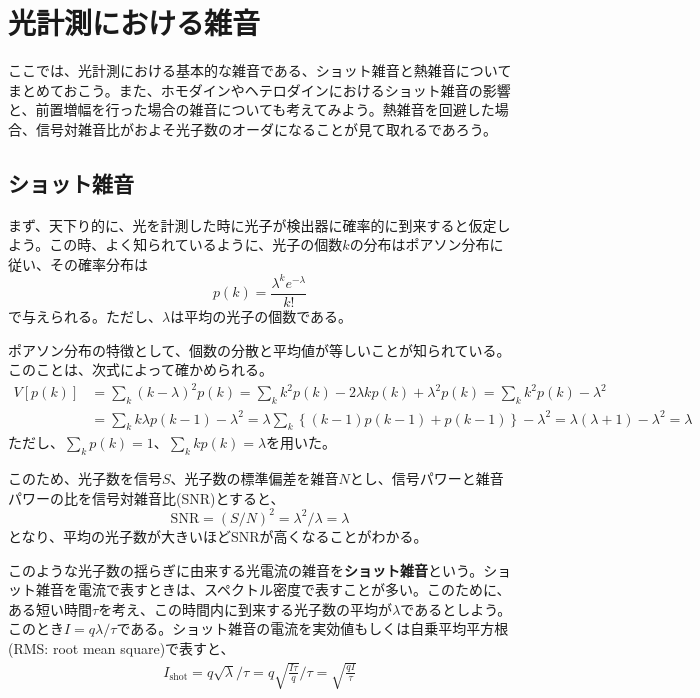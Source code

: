 \section{光計測における雑音}\label{section:1.2}

ここでは、光計測における基本的な雑音である、ショット雑音と熱雑音についてまとめておこう。また、ホモダインやヘテロダインにおけるショット雑音の影響と、前置増幅を行った場合の雑音についても考えてみよう。熱雑音を回避した場合、信号対雑音比がおよそ光子数のオーダになることが見て取れるであろう。

\subsection{ショット雑音}
まず、天下り的に、光を計測した時に光子が検出器に確率的に到来すると仮定しよう。この時、よく知られているように、光子の個数$k$の分布はポアソン分布に従い、その確率分布は
\begin{equation}
	p(k) = \frac{\lambda^k e^{-\lambda}}{k!}
\end{equation}
で与えられる。ただし、$\lambda$は平均の光子の個数である。

ポアソン分布の特徴として、個数の分散と平均値が等しいことが知られている。このことは、次式によって確かめられる。
\begin{equation}
\begin{aligned}
	V[p(k)] &= \sum_k{(k-\lambda)^2}p(k) = \sum_k{k^2 p(k) - 2\lambda k p(k) + \lambda^2 p(k)} = \sum_k{k^2 p(k) - \lambda^2} \\
	&=\sum_k{k\lambda p(k-1) - \lambda^2} = \lambda\sum_k{\left\{ (k-1)p(k-1) + p(k-1)\right\}}-\lambda^2 = \lambda(\lambda + 1) - \lambda^2 = \lambda
\end{aligned}
\end{equation}
ただし、$\sum_k p(k) = 1$、$\sum_k kp(k) = \lambda$を用いた。

このため、光子数を信号$S$、光子数の標準偏差を雑音$N$とし、信号パワーと雑音パワーの比を信号対雑音比(SNR)とすると、
\begin{equation}
	\mathrm{SNR} = (S/N)^2 = \lambda^2/\lambda = \lambda
\end{equation}
となり、平均の光子数が大きいほどSNRが高くなることがわかる。

このような光子数の揺らぎに由来する光電流の雑音を\textbf{ショット雑音}という。ショット雑音を電流で表すときは、スペクトル密度で表すことが多い。このために、ある短い時間$\tau$を考え、この時間内に到来する光子数の平均が$\lambda$であるとしよう。このとき$I = q\lambda / \tau$である。ショット雑音の電流を実効値もしくは自乗平均平方根(RMS: root mean square)で表すと、
\begin{equation}
	\begin{aligned}
		I_{\mathrm{shot}} = q\sqrt{\lambda}/\tau = q\sqrt{\frac{I\tau}{q}}/\tau = \sqrt{\frac{qI}{\tau}}
	\end{aligned}
\end{equation}

